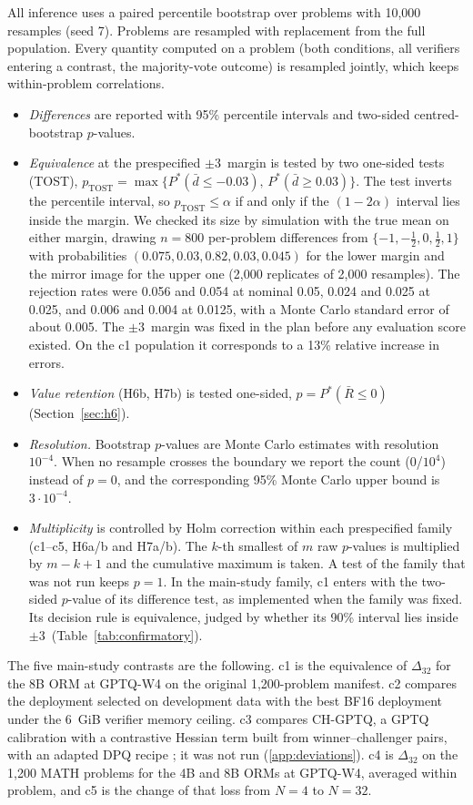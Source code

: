 All inference uses a paired percentile bootstrap over problems with 10,000 resamples
(seed 7). Problems are resampled with replacement from the full population. Every
quantity computed on a problem (both conditions, all verifiers entering a contrast, the
majority-vote outcome) is resampled jointly, which keeps within-problem correlations.
\begin{itemize}
\item \emph{Differences} are reported with 95\% percentile intervals and two-sided
centred-bootstrap $p$-values.
\item \emph{Equivalence} at the prespecified $\pm3$\pp\ margin is tested by two one-sided
tests (TOST), $p_{\mathrm{TOST}} = \max\{P^*(\bar d \le -0.03),\, P^*(\bar d \ge
0.03)\}$. The test inverts the percentile interval, so $p_{\mathrm{TOST}} \le \alpha$
if and only if the $(1-2\alpha)$ interval lies inside the margin. We checked its size by
simulation with the true mean on either margin, drawing $n=800$ per-problem differences
from $\{-1,-\tfrac12,0,\tfrac12,1\}$ with probabilities $(0.075, 0.03, 0.82, 0.03,
0.045)$ for the lower margin and the mirror image for the upper one (2,000 replicates of
2,000 resamples). The rejection rates were 0.056 and 0.054 at nominal 0.05, 0.024 and
0.025 at 0.025, and 0.006 and 0.004 at 0.0125, with a Monte Carlo standard error of about
0.005. The $\pm3$\pp\ margin was fixed in the plan before any evaluation score existed.
On the c1 population it corresponds to a 13\% relative increase in errors.
\item \emph{Value retention} (H6b, H7b) is tested one-sided, $p = P^*(\bar R \le 0)$
(Section~\ref{sec:h6}).
\item \emph{Resolution.} Bootstrap $p$-values are Monte Carlo estimates with resolution
$10^{-4}$. When no resample crosses the boundary we report the count (0/$10^4$) instead
of $p=0$, and the corresponding 95\% Monte Carlo upper bound is $3\cdot10^{-4}$.
\item \emph{Multiplicity} is controlled by Holm correction within each prespecified
family (c1--c5, H6a/b and H7a/b). The $k$-th smallest of $m$ raw $p$-values is
multiplied by $m-k+1$ and the cumulative maximum is taken. A test of the family that was
not run keeps $p=1$. In the main-study family, c1 enters with the two-sided $p$-value of
its difference test, as implemented when the family was fixed. Its decision rule is
equivalence, judged by whether its 90\% interval lies inside $\pm3$\pp\
(Table~\ref{tab:confirmatory}).
\end{itemize}
\noindent The five main-study contrasts are the following. c1 is the equivalence of
$\Delta_{32}$ for the 8B ORM at GPTQ-W4 on the original 1,200-problem manifest. c2
compares the deployment selected on development data with the best BF16 deployment under
the 6~GiB verifier memory ceiling. c3 compares CH-GPTQ, a GPTQ calibration with a
contrastive Hessian term built from winner--challenger pairs, with an adapted DPQ recipe
\cite{yang2026dpq}; it was not run (\ref{app:deviations}). c4 is $\Delta_{32}$ on the
1,200 MATH problems for the 4B and 8B ORMs at GPTQ-W4, averaged within problem, and c5 is
the change of that loss from $N=4$ to $N=32$.
